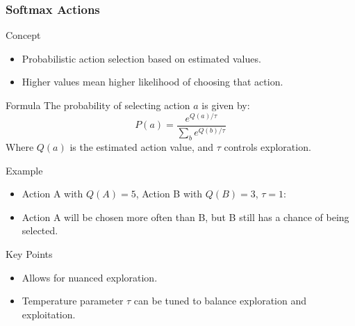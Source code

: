\documentclass[aspectratio=169]{beamer}
\begin{document}
\begin{frame}[fragile]
    \frametitle{Softmax Actions}
    \begin{block}{Concept}
        \begin{itemize}
            \item Probabilistic action selection based on estimated values.
            \item Higher values mean higher likelihood of choosing that action.
        \end{itemize}
    \end{block}

    \begin{block}{Formula}
        The probability of selecting action $a$ is given by:
        \begin{equation}
            P(a) = \frac{e^{Q(a) / \tau}}{\sum_{b} e^{Q(b) / \tau}}
        \end{equation}
        Where $Q(a)$ is the estimated action value, and $\tau$ controls exploration.
    \end{block}

    \begin{block}{Example}
        \begin{itemize}
            \item Action A with $Q(A) = 5$, Action B with $Q(B) = 3$, $\tau = 1$:
            \item Action A will be chosen more often than B, but B still has a chance of being selected.
        \end{itemize}
    \end{block}

    \begin{block}{Key Points}
        \begin{itemize}
            \item Allows for nuanced exploration.
            \item Temperature parameter $\tau$ can be tuned to balance exploration and exploitation.
        \end{itemize}
    \end{block}
\end{frame}
\end{document}
